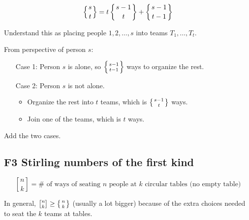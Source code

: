 \documentclass[12pt]{article}
\begin{document}
\begin{theorem}
    \[\left\{{s \atop t}\right\} = t\left\{{s-1 \atop t}\right\} + \left\{{s-1 \atop t-1}\right\}\]
\end{theorem}
Understand this as placing people $1,2,\dots, s$ into teams $T_1,\dots,T_t$.

From perspective of person $s$: \begin{itemize}[align=left]
    \item[Case 1: ] Person $s$ is alone, so $\left\{{s-1 \atop t-1}\right\}$ ways to organize the rest.
    \item[Case 2: ] Person $s$ is not alone. \begin{itemize}
        \item Organize the rest into $t$ teams, which is $\left\{{s-1 \atop t}\right\}$ ways.
        \item Join one of the teams, which is $t$ ways.
    \end{itemize}
\end{itemize}
Add the two cases.

\subsection{F3 Stirling numbers of the first kind}
 \[{n\brack k} = \# \text{ of ways of seating $n$ people at $k$ circular tables (no empty table)}\]

In general, ${n\brack k} \geq \left\{{n \atop k}\right\}$ (usually a lot bigger) because of the extra choices needed to seat the $k$ teams at tables.
\end{document}
